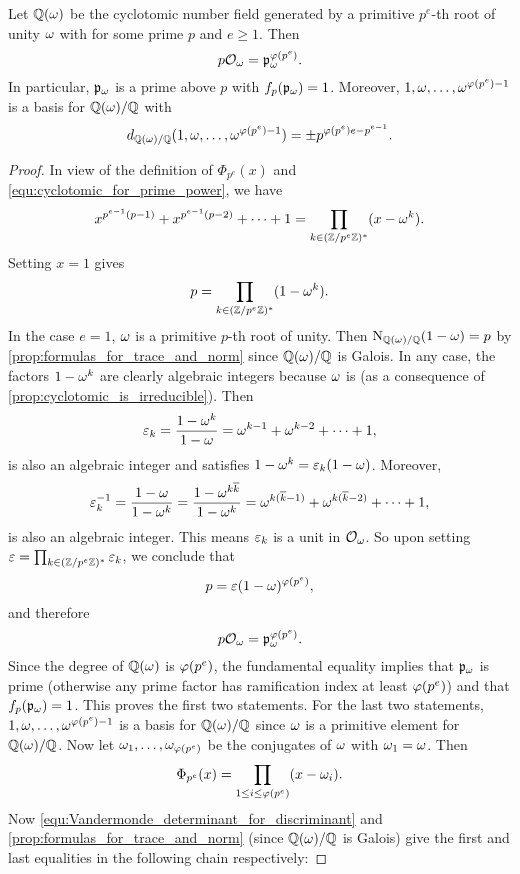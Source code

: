     \begin{lemma}\label{lem:prime_power_cyclotomic_lemma}
      Let $\mathbb{Q}(\omega)$ be the cyclotomic number field generated by a primitive $p^{e}$-th root of unity $\omega$ with for some prime $p$ and $e \ge 1$. Then
      \[
        p\mathcal{O}_{\omega} = \mathfrak{p}_{\omega}^{\varphi(p^{e})}.
      \]
      In particular, $\mathfrak{p}_{\omega}$ is a prime above $p$ with $f_{p}(\mathfrak{p}_{\omega}) = 1$. Moreover, $1,\omega,\ldots,\omega^{\varphi(p^{e})-1}$ is a basis for $\mathbb{Q}(\omega)/\mathbb{Q}$ with
      \[
        d_{\mathbb{Q}(\omega)/\mathbb{Q}}(1,\omega,\ldots,\omega^{\varphi(p^{e})-1}) = \pm p^{\varphi(p^{e})e-p^{e-1}}.
      \]
    \end{lemma}
    \begin{proof}
      In view of the definition of $\Phi_{p^{e}}(x)$ and \cref{equ:cyclotomic_for_prime_power}, we have
      \[
        x^{p^{e-1}(p-1)}+x^{p^{e-1}(p-2)}+\cdots+1 = \prod_{k \in (\mathbb{Z}/p^{e}\mathbb{Z})^{\ast}}(x-\omega^{k}).
      \]
      Setting $x = 1$ gives
      \[
        p = \prod_{k \in (\mathbb{Z}/p^{e}\mathbb{Z})^{\ast}}(1-\omega^{k}).
      \]
      In the case $e = 1$, $\omega$ is a primitive $p$-th root of unity. Then $\operatorname{\mathrm{N}}_{\mathbb{Q}(\omega)/\mathbb{Q}}(1-\omega) = p$ by \cref{prop:formulas_for_trace_and_norm} since $\mathbb{Q}(\omega)/\mathbb{Q}$ is Galois. In any case, the factors $1-\omega^{k}$ are clearly algebraic integers because $\omega$ is (as a consequence of \cref{prop:cyclotomic_is_irreducible}). Then
      \[
        \varepsilon_{k} = \frac{1-\omega^{k}}{1-\omega} = \omega^{k-1}+\omega^{k-2}+\cdots+1,
      \]
      is also an algebraic integer and satisfies $1-\omega^{k} = \varepsilon_{k}(1-\omega)$. Moreover,
      \[
        \varepsilon_{k}^{-1} = \frac{1-\omega}{1-\omega^{k}} = \frac{1-\omega^{k\overline{k}}}{1-\omega^{k}} = \omega^{k(\overline{k}-1)}+\omega^{k(\overline{k}-2)}+\cdots+1,
      \]
      is also an algebraic integer. This means $\varepsilon_{k}$ is a unit in $\mathcal{O}_{\omega}$. So upon setting $\varepsilon = \prod_{k \in (\mathbb{Z}/p^{e}\mathbb{Z})^{\ast}}\varepsilon_{k}$, we conclude that
      \[
        p = \varepsilon(1-\omega)^{\varphi(p^{e})},
      \]
      and therefore
      \[
        p\mathcal{O}_{\omega} = \mathfrak{p}_{\omega}^{\varphi(p^{e})}.
      \]
      Since the degree of $\mathbb{Q}(\omega)$ is $\varphi(p^{e})$, the fundamental equality implies that $\mathfrak{p}_{\omega}$ is prime (otherwise any prime factor has ramification index at least $\varphi(p^{e})$) and that $f_{p}(\mathfrak{p}_{\omega}) = 1$. This proves the first two statements. For the last two statements, $1,\omega,\ldots,\omega^{\varphi(p^{e})-1}$ is a basis for $\mathbb{Q}(\omega)/\mathbb{Q}$ since $\omega$ is a primitive element for $\mathbb{Q}(\omega)/\mathbb{Q}$. Now let $\omega_{1},\ldots,\omega_{\varphi(p^{e})}$ be the conjugates of $\omega$ with $\omega_{1} = \omega$. Then
      \[
        \Phi_{p^{e}}(x) = \prod_{1 \le i \le \varphi(p^{e})}(x-\omega_{i}).
      \]
      Now \cref{equ:Vandermonde_determinant_for_discriminant} and \cref{prop:formulas_for_trace_and_norm} (since $\mathbb{Q}(\omega)/\mathbb{Q}$ is Galois) give the first and last equalities in the following chain respectively:

\end{proof}
